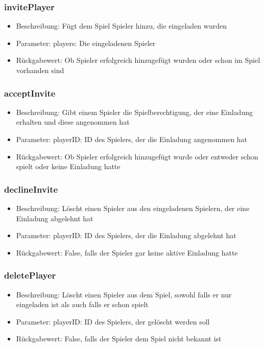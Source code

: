 \documentclass[a4paper]{scrreprt}
\begin{document}
	\subsubsection{invitePlayer}
		\begin{itemize}
			\item Beschreibung: Fügt dem Spiel Spieler hinzu, die eingeladen wurden
			\item Parameter: players: Die eingeladenen Spieler
			\item Rückgabewert: Ob Spieler erfolgreich hinzugefügt wurden oder schon im Spiel vorhanden sind
		\end{itemize}
	\subsubsection{acceptInvite}
		\begin{itemize}
			\item Beschreibung: Gibt einem Spieler die Spielberechtigung, der eine Einladung erhalten und diese angenommen hat
			\item Parameter: playerID: ID des Spielers, der die Einladung angenommen hat
			\item Rückgabewert: Ob Spieler erfolgreich hinzugefügt wurde oder entweder schon spielt oder keine Einladung hatte
		\end{itemize}
	\subsubsection{declineInvite}
		\begin{itemize}
			\item Beschreibung: Löscht einen Spieler aus den eingeladenen Spielern, der eine Einladung abgelehnt hat
			\item Parameter: playerID: ID des Spielers, der die Einladung abgelehnt hat
			\item Rückgabewert: False, falls der Spieler gar keine aktive Einladung hatte
		\end{itemize}
	\subsubsection{deletePlayer}
		\begin{itemize}
			\item Beschreibung: Löscht einen Spieler aus dem Spiel, sowohl falls er nur eingeladen ist als auch falls er schon spielt
			\item Parameter: playerID: ID des Spielers, der gelöscht werden soll
			\item Rückgabewert: False, falls der Spieler dem Spiel nicht bekannt ist
		\end{itemize}
\end{document}
